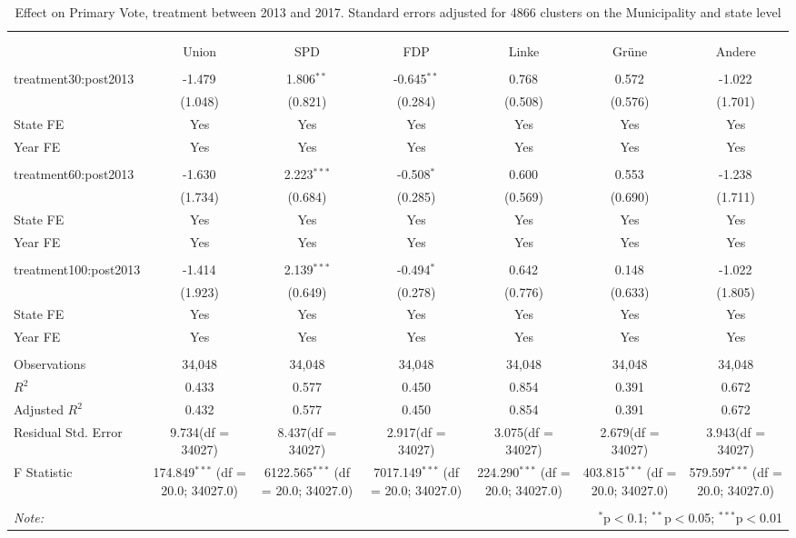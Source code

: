 \documentclass[12pt]{article}
\begin{document}
 
\begin{table}[!htbp] \centering
  \caption{Effect on Primary Vote, treatment between 2013 and 2017. Standard errors adjusted for 4866 clusters on the Municipality and state level}
\begin{tabular}{@{\extracolsep{5pt}}lcccccc}
\\[-1.8ex]\hline
\hline \\[-1.8ex]
\\[-1.8ex] & \multicolumn{1}{c}{Union} & \multicolumn{1}{c}{SPD} & \multicolumn{1}{c}{FDP} & \multicolumn{1}{c}{Linke} & \multicolumn{1}{c}{Grüne} & \multicolumn{1}{c}{Andere}  \\
\hline \\[-1.8ex]
 treatment30:post2013 & -1.479$^{}$ & 1.806$^{**}$ & -0.645$^{**}$ & 0.768$^{}$ & 0.572$^{}$ & -1.022$^{}$ \\
  & (1.048) & (0.821) & (0.284) & (0.508) & (0.576) & (1.701) \\
 State FE & Yes & Yes & Yes & Yes & Yes & Yes \\
 Year FE & Yes & Yes & Yes & Yes & Yes & Yes \\
\hline \\[-1.8ex]
 treatment60:post2013 & -1.630$^{}$ & 2.223$^{***}$ & -0.508$^{*}$ & 0.600$^{}$ & 0.553$^{}$ & -1.238$^{}$ \\
  & (1.734) & (0.684) & (0.285) & (0.569) & (0.690) & (1.711) \\
 State FE & Yes & Yes & Yes & Yes & Yes & Yes \\
 Year FE & Yes & Yes & Yes & Yes & Yes & Yes \\
\hline \\[-1.8ex]
 treatment100:post2013 & -1.414$^{}$ & 2.139$^{***}$ & -0.494$^{*}$ & 0.642$^{}$ & 0.148$^{}$ & -1.022$^{}$ \\
  & (1.923) & (0.649) & (0.278) & (0.776) & (0.633) & (1.805) \\
 State FE & Yes & Yes & Yes & Yes & Yes & Yes \\
 Year FE & Yes & Yes & Yes & Yes & Yes & Yes \\
\hline \\[-1.8ex]
 Observations & 34,048 & 34,048 & 34,048 & 34,048 & 34,048 & 34,048 \\
 $R^2$ & 0.433 & 0.577 & 0.450 & 0.854 & 0.391 & 0.672 \\
 Adjusted $R^2$ & 0.432 & 0.577 & 0.450 & 0.854 & 0.391 & 0.672 \\
 Residual Std. Error & 9.734(df = 34027) & 8.437(df = 34027) & 2.917(df = 34027) & 3.075(df = 34027) & 2.679(df = 34027) & 3.943(df = 34027)  \\
 F Statistic & 174.849$^{***}$ (df = 20.0; 34027.0) & 6122.565$^{***}$ (df = 20.0; 34027.0) & 7017.149$^{***}$ (df = 20.0; 34027.0) & 224.290$^{***}$ (df = 20.0; 34027.0) & 403.815$^{***}$ (df = 20.0; 34027.0) & 579.597$^{***}$ (df = 20.0; 34027.0) \\
\hline
\hline \\[-1.8ex]
\textit{Note:} & \multicolumn{6}{r}{$^{*}$p$<$0.1; $^{**}$p$<$0.05; $^{***}$p$<$0.01} \\
\end{tabular}
\end{table}
\end{document}
